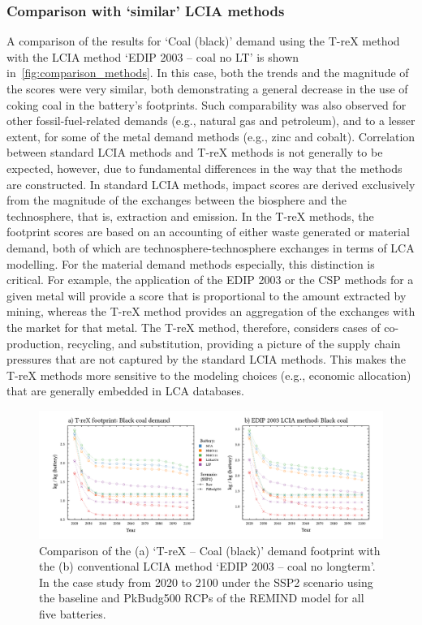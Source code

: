 \documentclass[a4paper,fleqn]{cas-dc}
\begin{document}
\subsubsection{Comparison with `similar' LCIA methods}\label{sec:results-case_study-methodcomparison}

A comparison of the results for `Coal (black)' demand using the T-reX method
with the LCIA method `EDIP 2003 – coal no LT' is shown
in~\autoref{fig:comparison_methods}. In this case, both the trends and the
magnitude of the scores were very similar, both demonstrating a general
decrease in the use of coking coal in the battery's footprints. Such
comparability was also observed for other fossil-fuel-related demands (e.g.,
natural gas and petroleum), and to a lesser extent, for some of the metal
demand methods (e.g., zinc and cobalt). Correlation between standard LCIA
methods and T-reX methods is not generally to be expected, however, due to
fundamental differences in the way that the methods are constructed. In
standard LCIA methods, impact scores are derived exclusively from the magnitude
of the exchanges between the biosphere and the technosphere, that is,
extraction and emission. In the T-reX methods, the footprint scores are based
on an accounting of either waste generated or material demand, both of which
are technosphere-technosphere exchanges in terms of LCA modelling. For the
material demand methods especially, this distinction is critical. For example,
the application of the EDIP 2003 or the CSP methods for a given metal will
provide a score that is proportional to the amount extracted by mining, whereas
the T-reX method provides an aggregation of the exchanges with the market for
that metal. The T-reX method, therefore, considers cases of co-production,
recycling, and substitution, providing a picture of the supply chain pressures
that are not captured by the standard LCIA methods. This makes the T-reX
methods more sensitive to the modeling choices (e.g., economic allocation) that
are generally embedded in LCA databases.

\begin{figure}[!htbp]
	\centering
	\includegraphics[width=1.8\columnwidth]{figs/T-reX-coalANDedip.pdf}
	\caption{Comparison of the (a) `T-reX – Coal (black)' demand footprint with the (b) conventional LCIA method `EDIP 2003 – coal no longterm'. In the case study from 2020 to 2100 under the SSP2 scenario using the baseline and PkBudg500 RCPs of the REMIND model for all five batteries.}\label{fig:comparison_methods}
\end{figure}
\end{document}
